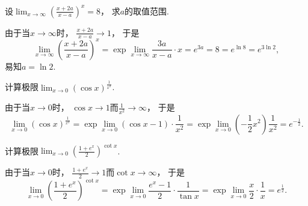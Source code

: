 \begin{example}
设\(\lim_{x\to\infty} \left( \frac{x+2a}{x-a} \right)^x = 8\)，
求\(a\)的取值范围.
\begin{solution}
由于当\(x\to\infty\)时，
\(\frac{x+2a}{x-a} \to 1\)，
于是\[
	\lim_{x\to\infty} \left( \frac{x+2a}{x-a} \right)^x
	= \exp\lim_{x\to\infty} \frac{3a}{x-a} \cdot x
	= e^{3a}
	= 8 = e^{\ln8} = e^{3\ln2},
\]
易知\(a = \ln2\).
\end{solution}
\end{example}

\begin{example}
计算极限\(\lim_{x\to0} (\cos x)^{\frac1{x^2}}\).
\begin{solution}
由于当\(x\to0\)时，
\(\cos x \to 1\)而\(\frac1{x^2} \to \infty\)，
于是\[
	\lim_{x\to0} (\cos x)^{\frac1{x^2}}
	= \exp\lim_{x\to0} (\cos x - 1) \cdot \frac1{x^2}
	= \exp\lim_{x\to0} \left( -\frac12 x^2 \right) \frac1{x^2}
	= e^{-\frac12}.
\]
\end{solution}
\end{example}

\begin{example}
计算极限\(\lim_{x\to0} \left( \frac{1+e^x}2 \right)^{\cot x}\).
\begin{solution}
由于当\(x\to0\)时，
\(\frac{1+e^x}2 \to 1\)而\(\cot x \to \infty\)，
于是\[
	\lim_{x\to0} \left( \frac{1+e^x}2 \right)^{\cot x}
	= \exp\lim_{x\to0} \frac{e^x-1}2 \cdot \frac1{\tan x}
	= \exp\lim_{x\to0} \frac{x}2 \cdot \frac1x
	= e^{\frac12}.
\]
\end{solution}
\end{example}

